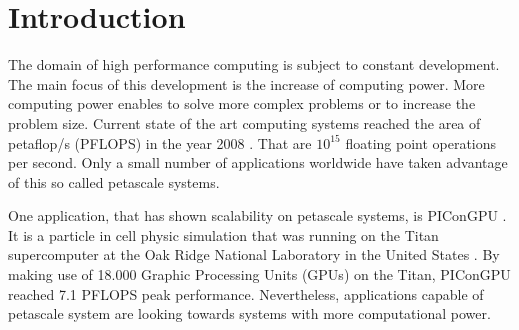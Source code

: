 \chapter{Introduction}
\label{sec:intro}



The domain of high performance computing is subject to constant
development.  The main focus of this development is the increase of
computing power.  More computing power enables to solve more complex
problems or to increase the problem size.  Current state of the art
computing systems reached the area of petaflop/s (PFLOPS) in the year
2008 \cite{ref:ibm_roadrunner}. That are $10^{15}$ floating point
operations per second.  Only a small number of applications worldwide
have taken advantage of this so called petascale systems.

One application, that has shown scalability on petascale systems, is
PIConGPU \cite{ref:picongpu_scale}. It is a particle in cell physic
simulation that was running on the Titan supercomputer at the Oak
Ridge National Laboratory in the United States \cite{ref:titan}. By
making use of 18.000 Graphic Processing Units (GPUs) on the Titan,
PIConGPU reached 7.1 PFLOPS peak performance.  Nevertheless,
applications capable of petascale system are looking towards systems
with more computational power.

